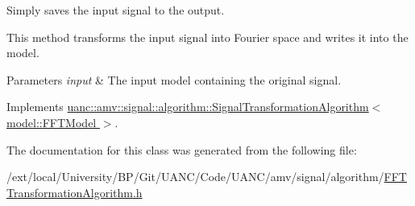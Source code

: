 Simply saves the input signal to the output. 

This method transforms the input signal into Fourier space and writes it into the model.


\begin{DoxyParams}{Parameters}
{\em input} & The input model containing the original signal. \\
\hline
\end{DoxyParams}


Implements \hyperlink{classuanc_1_1amv_1_1signal_1_1algorithm_1_1_signal_transformation_algorithm_a40dee2d59e84244373cacc9c472514d6}{uanc\+::amv\+::signal\+::algorithm\+::\+Signal\+Transformation\+Algorithm$<$ model\+::\+F\+F\+T\+Model $>$}.



The documentation for this class was generated from the following file\+:\begin{DoxyCompactItemize}
\item 
/ext/local/\+University/\+B\+P/\+Git/\+U\+A\+N\+C/\+Code/\+U\+A\+N\+C/amv/signal/algorithm/\hyperlink{_f_f_t_transformation_algorithm_8h}{F\+F\+T\+Transformation\+Algorithm.\+h}\end{DoxyCompactItemize}
